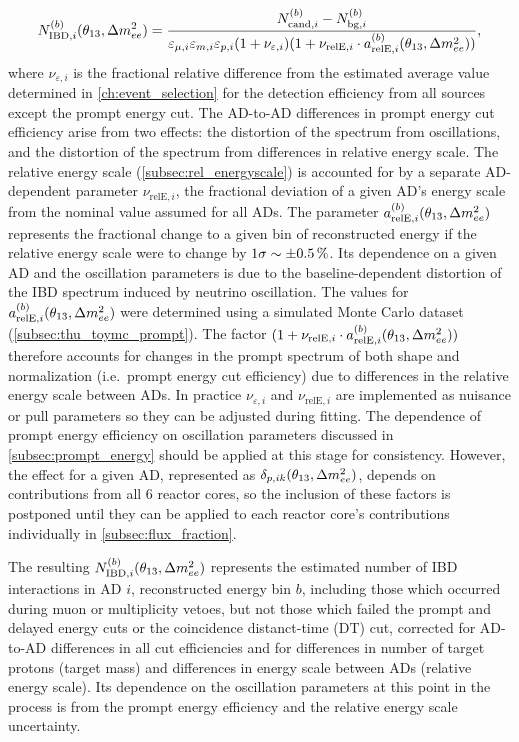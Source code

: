 \begin{equation}\label{eq:near_hall_bg_eff}
    N_{\text{IBD},i}^{(b)}(\theta_{13}, \Delta m^2_{ee}) =
    \frac{N_{\text{cand},i}^{(b)} - N_{\text{bg},i}^{(b)}}{
        \varepsilon_{\mu,i}\varepsilon_{m,i}\varepsilon_{p,i}(1+\nu_{\varepsilon,i})
        (1 + \nu_{\text{relE},i}\cdot a_{\text{relE},i}^{(b)}(\theta_{13}, \Delta m^2_{ee}))
    },
\end{equation}
where $\nu_{\varepsilon,i}$ is the fractional relative difference from
the estimated average value determined in \cref{ch:event_selection}
for the detection efficiency from all sources except the prompt energy cut.
The AD-to-AD differences in prompt energy cut efficiency arise from two effects:
the distortion of the spectrum from oscillations,
and the distortion of the spectrum from differences
in relative energy scale.
The relative energy scale (\cref{subsec:rel_energyscale})
is accounted for by a separate AD-dependent parameter $\nu_{\text{relE},i}$,
the fractional deviation of a given AD's energy scale
from the nominal value assumed for all ADs.
The parameter $a_{\text{relE},i}^{(b)}(\theta_{13}, \Delta m^2_{ee})$
represents the fractional change to a given bin of reconstructed energy
if the relative energy scale were to change by $1\sigma \sim \SI{+-0.5}{\percent}$.
Its dependence on a given AD and the oscillation parameters is
due to the baseline-dependent distortion of the IBD spectrum
induced by neutrino oscillation.
The values for $a_{\text{relE},i}^{(b)}(\theta_{13}, \Delta m^2_{ee})$ were determined using
a simulated Monte Carlo dataset (\cref{subsec:thu_toymc_prompt}).
The factor $(1 + \nu_{\text{relE},i}\cdot a_{\text{relE},i}^{(b)}(\theta_{13},\Delta m^2_{ee}))$
therefore accounts for changes in the prompt spectrum of
both shape and normalization (i.e.\ prompt energy cut efficiency)
due to differences in the relative energy scale between ADs.
In practice $\nu_{\varepsilon,i}$ and $\nu_{\text{relE},i}$
are implemented as nuisance or pull parameters
so they can be adjusted during fitting.
The dependence of prompt energy efficiency on oscillation parameters
discussed in \cref{subsec:prompt_energy}
should be applied at this stage for consistency.
However, the effect for a given AD, represented as $\delta_{p,ik}(\theta_{13}, \Delta m^2_{ee})$,
depends on contributions from all 6 reactor cores,
so the inclusion of these factors is postponed
until they can be applied to each reactor core's contributions
individually in \cref{subsec:flux_fraction}.

The resulting $N_{\text{IBD},i}^{(b)}(\theta_{13}, \Delta m^2_{ee})$ represents
the estimated number of IBD interactions in AD $i$,
reconstructed energy bin $b$,
including those which occurred during muon or multiplicity vetoes,
but not those which failed the prompt and delayed energy cuts
or the coincidence distanct-time (DT) cut,
corrected for AD-to-AD differences in all cut efficiencies
and for differences in number of target protons (target mass)
and differences in energy scale between ADs (relative energy scale).
Its dependence on the oscillation parameters at this point in the process
is from the prompt energy efficiency
and the relative energy scale uncertainty.


